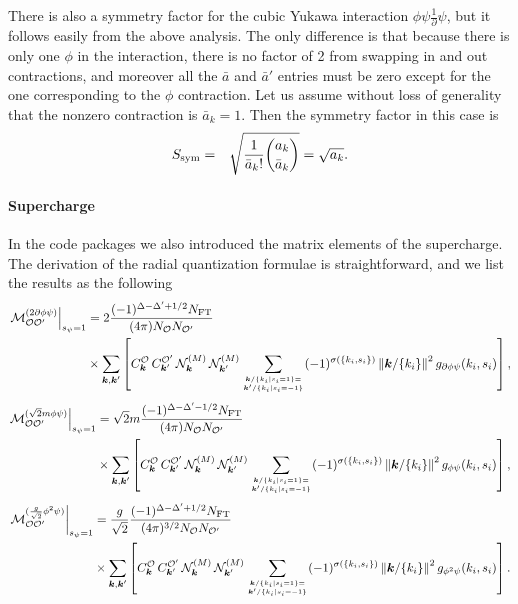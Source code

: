 \documentclass[12pt]{article}
\newcommand{\be}{\begin{eqnarray}}
\newcommand{\ee}{\end{eqnarray}}
\newcommand{\Mcal}{{\mathcal M}}
\newcommand{\Ncal}{{\mathcal N}}
\newcommand{\cO}{{\mathcal O}}
\newcommand{\CO}{{\cal O}}
\newcommand{\nn}{\nonumber}
\newcommand{\bk}{\boldsymbol{k}}
\newcommand{\norm}[1]{\left\lVert#1\right\rVert}
\begin{document}
There is also a symmetry factor for the cubic Yukawa interaction $\phi \psi \frac{1}{\partial} \psi$, but it follows easily from the above analysis.  The only difference is that because there is only one $\phi$ in the interaction, there is no factor of 2 from swapping in and out contractions, and moreover all the $\bar{a}$ and $\bar{a}'$ entries must be zero except for the one corresponding to the $\phi$ contraction.  Let us assume without loss of generality that the nonzero contraction is $\bar{a}_k=1$.  Then the symmetry factor in this case is
\be\label{eq:symFactorYukawaCubic}
S_{\rm sym} &=&  \sqrt{ 
    \frac{1}{\bar a_k!} \binom{a_k}{\bar a_k} } =  \sqrt{a_k}.
\ee

\paragraph{Supercharge} 
In the code packages we also introduced the matrix elements of the supercharge. The derivation of the radial quantization formulae is straightforward, and we list the results as the following
\begin{align}
\label{eq:PMRQ}
\left.
\Mcal_{\CO \CO^\prime}^{(2 \partial\phi \psi)}
\right|_{s_{\psi} = 1} &=
2\frac{(-1)^{\Delta-\Delta'+1/2}N_{\rm FT}}{(4\pi)N_{\CO} N_{\CO'}} \nn \\
& \times  \sum_{\bk, \bk'} \left[  C^{\cO}_{\bk} \, C^{\cO'}_{\bk^\prime} \, \Ncal^{(M)}_{\bk}\, \Ncal^{(M)}_{\bk'}  \sum_{\bk/\{k_i| s_i=1\} = \atop  \bk'/\{k_i | s_i =-1 \}}(-1)^{\sigma(\{k_i, s_i\}) }  \norm{\bk/\{k_i\}}^2 g_{\partial\phi\psi}(k_i, s_i) \right],
\end{align}
\begin{align}
\label{eq:PP2RQ}
\left.
\Mcal_{\CO \CO^\prime}^{(\sqrt{2}m \phi \psi)} 
\right|_{s_{\psi} = 1} &=
\sqrt{2}m \frac{(-1)^{\Delta-\Delta'-1/2}N_{\rm FT}}{(4\pi)N_{\CO} N_{\CO'}} \nn \\
& \times  \sum_{\bk, \bk'} \left[  C^{\cO}_{\bk} \, C^{\cO'}_{\bk^\prime} \, \Ncal^{(M)}_{\bk}\, \Ncal^{(M)}_{\bk'}  \sum_{\bk/\{k_i| s_i=1\} = \atop  \bk'/\{k_i | s_i =-1 \}}(-1)^{\sigma(\{k_i, s_i\}) }  \norm{\bk/\{k_i\}}^2 g_{\phi\psi}(k_i, s_i) \right],
\end{align}
\begin{align}
\label{eq:PP3RQ}
\left.
\Mcal_{\CO \CO^\prime}^{(\frac{g}{\sqrt{2}} \phi^2 \psi)}
\right|_{s_{\psi} = 1}  &=
\frac{g}{\sqrt{2}} \frac{(-1)^{\Delta-\Delta'+1/2}N_{\rm FT}}{(4\pi)^{3/2}N_{\CO} N_{\CO'}} \nn \\
& \times  \sum_{\bk, \bk'} \left[  C^{\cO}_{\bk} \, C^{\cO'}_{\bk^\prime} \, \Ncal^{(M)}_{\bk}\, \Ncal^{(M)}_{\bk'}  \sum_{\bk/\{k_i| s_i=1\} = \atop  \bk'/\{k_i | s_i =-1 \}}(-1)^{\sigma(\{k_i, s_i\}) }  \norm{\bk/\{k_i\}}^2 g_{\phi^2\psi}(k_i, s_i) \right].
\end{align}
\end{document}
